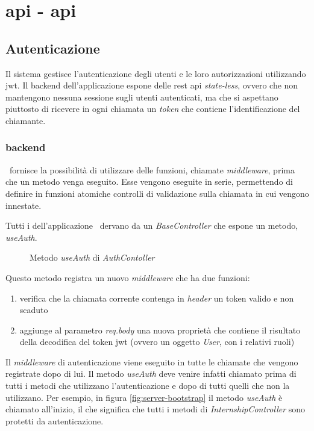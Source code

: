 \chapter{\acrshort{api} - \acrlong{api}}

\section{Autenticazione}
\label{chap:api}

Il sistema gestisce l'autenticazione degli utenti e le loro autorizzazioni utilizzando \gls{jwt}. Il \gls{backend} dell'applicazione espone delle \acrshort{rest} \acrshort{api} \textit{state-less}, ovvero che non mantengono nessuna sessione sugli utenti autenticati, ma che si aspettano piuttosto di ricevere in ogni chiamata un \textit{token} che contiene l'identificazione del chiamante.

\subsection{\Gls{backend}}

\expressjs~fornisce la possibilità di utilizzare delle funzioni, chiamate \textit{middleware}, prima che un metodo venga eseguito. Esse vengono eseguite in serie, permettendo di definire in funzioni atomiche controlli di validazione sulla chiamata in cui vengono innestate.

Tutti i \textit{} dell'applicazione \nodejs~dervano da un \textit{BaseController} che espone un metodo, \textit{useAuth}.

\begin{figure}[H] 
	\centering    
	
	\caption[Metodo \textit{useAuth} di \textit{AuthContoller}]{Metodo \textit{useAuth} di \textit{AuthContoller}}
	\label{fig:server-base-controller}
\end{figure}

\noindent
Questo metodo registra un nuovo \textit{middleware} che ha due funzioni:
\begin{enumerate}
	\item verifica che la chiamata corrente contenga in \textit{header} un token valido e non scaduto
	\item aggiunge al parametro \textit{req.body} una nuova proprietà che contiene il risultato della decodifica del token \acrshort{jwt} (ovvero un oggetto \textit{User}, con i relativi ruoli)
\end{enumerate}
Il \textit{middleware} di autenticazione viene eseguito in tutte le chiamate che vengono registrate dopo di lui. Il metodo \textit{useAuth} deve venire infatti chiamato prima di tutti i metodi che utilizzano l'autenticazione e dopo di tutti quelli che non la utilizzano. Per esempio, in figura \ref{fig:server-bootstrap} il metodo \textit{useAuth} è chiamato all'inizio, il che significa che tutti i metodi di \textit{InternshipController} sono protetti da autenticazione.

